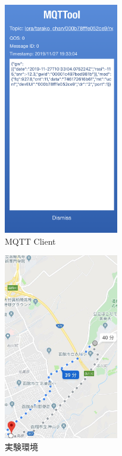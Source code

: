 \begin{figure}[]
    \begin{center}
    \includegraphics[width=5cm]{figures/mqtt.PNG}
    \caption{MQTT Client}
    \label{fig:mqtt}
    \end{center}
\end{figure}

\begin{figure}[]
    \begin{center}
    \includegraphics[width=5cm]{figures/v2.0/google_map.jpg}
    \caption{実験環境}
    \label{fig:google_map}
    \end{center}
\end{figure}

